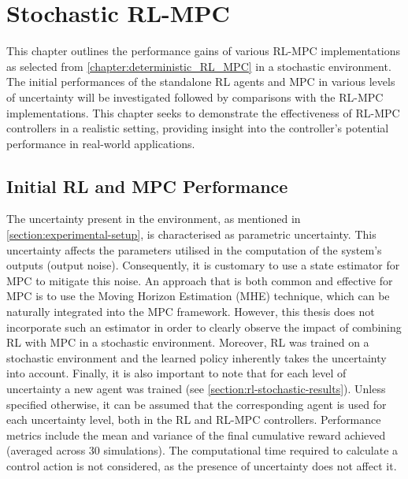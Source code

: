 \chapter{Stochastic RL-MPC}
\label{chapter:stochastic_RL_MPC}

This chapter outlines the performance gains of various RL-MPC implementations as selected from \autoref{chapter:deterministic_RL_MPC} in a stochastic environment. The initial performances of the standalone RL agents and MPC in various levels of uncertainty will be investigated followed by comparisons with the RL-MPC implementations. This chapter seeks to demonstrate the effectiveness of RL-MPC controllers in a realistic setting, providing insight into the controller's potential performance in real-world applications.

\section{Initial RL and MPC Performance}
The uncertainty present in the environment, as mentioned in \autoref{section:experimental-setup}, is characterised as parametric uncertainty. This uncertainty affects the parameters utilised in the computation of the system's outputs (output noise). Consequently, it is customary to use a state estimator for MPC to mitigate this noise. An approach that is both common and effective for MPC is to use the Moving Horizon Estimation (MHE) technique, which can be naturally integrated into the MPC framework. However, this thesis does not incorporate such an estimator in order to clearly observe the impact of combining RL with MPC in a stochastic environment. Moreover, RL was trained on a stochastic environment and the learned policy inherently takes the uncertainty into account. Finally, it is also important to note that for each level of uncertainty a new agent was trained (see \autoref{section:rl-stochastic-results}). Unless specified otherwise, it can be assumed that the corresponding agent is used for each uncertainty level, both in the RL and RL-MPC controllers. Performance metrics include the mean and variance of the final cumulative reward achieved (averaged across 30 simulations). The computational time required to calculate a control action is not considered, as the presence of uncertainty does not affect it.


